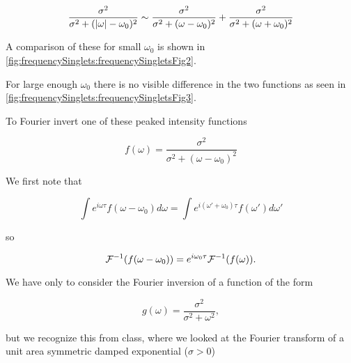 {\begin{dmath}\label{eqn:modernOptics:problemSet3:1:240}
\frac{\sigma^2}
{
\sigma^2 + (\Abs{\omega} - \omega_0)^2
}
\sim
\frac{\sigma^2}
{
\sigma^2 + (\omega - \omega_0)^2
}
+
\frac{\sigma^2}
{
\sigma^2 + (\omega + \omega_0)^2
}
\end{dmath}

A comparison of these for small $\omega_0$ is shown in \cref{fig:frequencySinglets:frequencySingletsFig2}.


For large enough $\omega_0$ there is no visible difference in the two functions  as seen in \cref{fig:frequencySinglets:frequencySingletsFig3}.


To Fourier invert one of these peaked intensity functions

\begin{dmath}\label{eqn:modernOptics:problemSet3:1:260}
f(\omega) =
\frac{\sigma^2}
{
\sigma^2 + (\omega - \omega_0)^2
}
\end{dmath}

We first note that 

\begin{dmath}\label{eqn:modernOptics:problemSet3:1:280}
\int e^{i \omega \tau} f(\omega - \omega_0) d\omega
=
\int e^{i (\omega' + \omega_0) \tau} f(\omega') d\omega'
\end{dmath}

so

\begin{dmath}\label{eqn:modernOptics:problemSet3:1:300}
\FF^{-1}(f(\omega - \omega_0)) = e^{i\omega_0 \tau} \FF^{-1} (f(\omega)).
\end{dmath}

We have only to consider the Fourier inversion of a function of the form

\begin{dmath}\label{eqn:modernOptics:problemSet3:1:320}
g(\omega) =
\frac{\sigma^2}
{
\sigma^2 + \omega^2
},
\end{dmath}

but we recognize this from class, where we looked at the Fourier transform of a unit area symmetric damped exponential ($\sigma > 0$)

}
